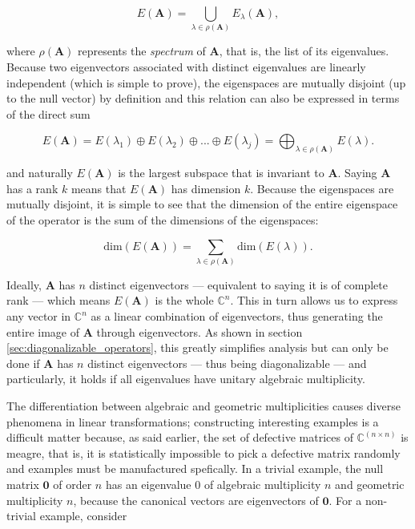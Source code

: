 \begin{equation} E\left(\mathbf{A}\right) = \bigcup_{\lambda\in\rho\left(\mathbf{A}\right)} E_\lambda\left(\mathbf{A}\right), \end{equation}

	\noindent where $\rho\left(\mathbf{A}\right)$ represents the \textit{spectrum} of $\mathbf{A}$, that is, the list of its eigenvalues. Because two eigenvectors associated with distinct eigenvalues are linearly independent (which is simple to prove), the eigenspaces are mutually disjoint (up to the null vector) by definition and this relation can also be expressed in terms of the direct sum

\begin{equation} E\left(\mathbf{A}\right) = E\left(\lambda_1\right)\oplus E\left(\lambda_2\right) \oplus ... \oplus E\left(\lambda_j\right) = \bigoplus_{\lambda\in \rho\left(\mathbf{A}\right)} E\left(\lambda\right). \end{equation}

	\noindent and naturally $E\left(\mathbf{A}\right)$ is the largest subspace that is invariant to $\mathbf{A}$. Saying $\mathbf{A}$ has a rank $k$ means that $E\left(\mathbf{A}\right)$ has dimension $k$. Because the eigenspaces are mutually disjoint, it is simple to see that the dimension of the entire eigenspace of the operator is the sum of the dimensions of the eigenspaces:

\begin{equation} \text{dim}\left(E\left(\mathbf{A}\right)\right) = \sum_{\lambda\in \rho\left(\mathbf{A}\right)} \text{dim}\left(E\left(\lambda\right)\right). \end{equation}

	Ideally, $\mathbf{A}$ has $n$ distinct eigenvectors — equivalent to saying it is of complete rank — which means $E\left(\mathbf{A}\right)$ is the whole $\mathbb{C}^n$. This in turn allows us to express any vector in $\mathbb{C}^n$ as a linear combination of eigenvectors, thus generating the entire image of $\mathbf{A}$ through eigenvectors. As shown in section \ref{sec:diagonalizable_operators}, this greatly simplifies analysis but can only be done if $\mathbf{A}$ has $n$ distinct eigenvectors — thus being diagonalizable — and particularly, it holds if all eigenvalues have unitary algebraic multiplicity.

	The differentiation between algebraic and geometric multiplicities causes diverse phenomena in linear transformations; constructing interesting examples is a difficult matter because, as said earlier, the set of defective matrices of $\mathbb{C}^{(n\times n)}$ is meagre, that is, it is statistically impossible to pick a defective matrix randomly and examples must be manufactured spefically. In a trivial example, the null matrix $\mathbf{0}$ of order $n$ has an eigenvalue $0$ of algebraic multiplicity $n$ and geometric multiplicity $n$, because the canonical vectors are eigenvectors of $\mathbf{0}$. For a non-trivial example, consider

